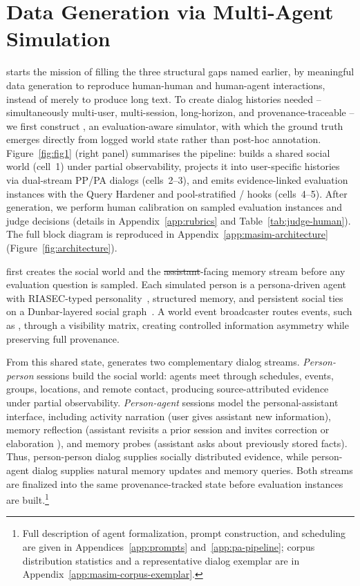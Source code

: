 \section{Data Generation via Multi-Agent Simulation \texorpdfstring{\cred{[0.9 pages]}}{[0.9 pages]}}
\label{sec:datagen}
\benchmark starts the mission of filling the three structural gaps named earlier, by meaningful data generation to reproduce human-human and human-agent interactions, instead of 
merely to produce long text. 
To create dialog histories needed -- simultaneously multi-user, multi-session, long-horizon, and provenance-traceable -- 
we first construct \masim, an evaluation-aware simulator, with which the ground truth emerges directly from logged world state rather than post-hoc annotation. 
Figure~\ref{fig:fig1} (right panel) summarises the pipeline: \masim builds a shared social world (cell~1) under partial observability, projects it into user-specific histories via dual-stream PP/PA dialogs (cells~2--3), and emits evidence-linked evaluation instances with the Query Hardener and pool-stratified \DSixName / \DFiveName hooks (cells~4--5). After generation, we perform human calibration on sampled evaluation instances and judge decisions (details in Appendix~\ref{app:rubrics} and Table~\ref{tab:judge-human}). The full \masim block diagram is reproduced in Appendix~\ref{app:masim-architecture} (Figure~\ref{fig:architecture}).

\masim first creates the social world and the \st{assistant}-facing memory stream before any evaluation question is sampled. 
Each simulated person is a persona-driven agent with RIASEC-typed personality~\citep{holland1997making}, structured memory, and persistent social ties on a Dunbar-layered social graph~\citep{dunbar2024social}. 
A world event broadcaster routes events, such as , through a visibility matrix, creating controlled information asymmetry while preserving full provenance. 

From this shared state, \masim generates two complementary dialog streams. \emph{Person-person} sessions build the social world: agents meet through schedules, events, groups, locations, and remote contact, producing source-attributed evidence under partial observability. \emph{Person-agent} sessions model the personal-assistant interface, 
including activity narration (user gives assistant new information), memory reflection (assistant revisits a prior session and invites correction or elaboration ), and memory probes (assistant asks about previously stored facts). 
Thus, person-person dialog supplies socially distributed evidence, while person-agent dialog supplies natural memory updates and memory queries. Both streams are finalized into the same provenance-tracked state before evaluation instances are built.\footnote{Full description of agent formalization, prompt construction, and scheduling are given in Appendices~\ref{app:prompts} and~\ref{app:pa-pipeline}; corpus distribution statistics and a representative dialog exemplar are in Appendix~\ref{app:masim-corpus-exemplar}.}

